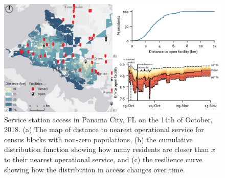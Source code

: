 \documentclass[9pt,twoside,lineno]{pnas-new}
\begin{document}
\begin{figure}
    \centering
    \includegraphics[width=\linewidth]{report/fig/FigS_fl_station.png}
    \caption{
    Service station access in Panama City, FL on the 14th of October, 2018. (a) The map of distance to nearest operational service for census blocks with non-zero populations, (b) the cumulative distribution function showing how many residents are closer than $x$ to their nearest operational service, and (c) the resilience curve showing how the distribution in access changes over time.
    }
    \label{figS:fl_station}
\end{figure}
\end{document}
